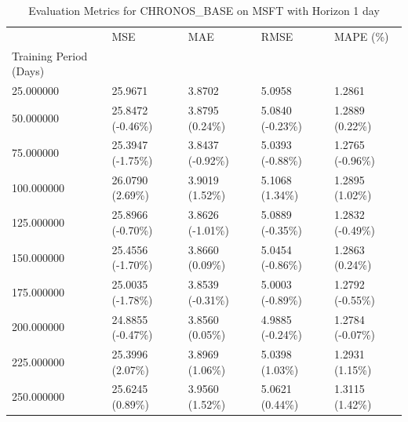 \begin{table}
\caption{Evaluation Metrics for CHRONOS_BASE on MSFT with Horizon 1 day}
\label{tab:chronos_base_MSFT_h1_metrics}
\begin{tabular}{lllll}
\toprule
 & MSE & MAE & RMSE & MAPE (\%) \\
Training Period (Days) &  &  &  &  \\
\midrule
25.000000 & 25.9671 & 3.8702 & 5.0958 & 1.2861 \\
50.000000 & 25.8472 (-0.46\%) & 3.8795 (0.24\%) & 5.0840 (-0.23\%) & 1.2889 (0.22\%) \\
75.000000 & 25.3947 (-1.75\%) & 3.8437 (-0.92\%) & 5.0393 (-0.88\%) & 1.2765 (-0.96\%) \\
100.000000 & 26.0790 (2.69\%) & 3.9019 (1.52\%) & 5.1068 (1.34\%) & 1.2895 (1.02\%) \\
125.000000 & 25.8966 (-0.70\%) & 3.8626 (-1.01\%) & 5.0889 (-0.35\%) & 1.2832 (-0.49\%) \\
150.000000 & 25.4556 (-1.70\%) & 3.8660 (0.09\%) & 5.0454 (-0.86\%) & 1.2863 (0.24\%) \\
175.000000 & 25.0035 (-1.78\%) & 3.8539 (-0.31\%) & 5.0003 (-0.89\%) & 1.2792 (-0.55\%) \\
200.000000 & 24.8855 (-0.47\%) & 3.8560 (0.05\%) & 4.9885 (-0.24\%) & 1.2784 (-0.07\%) \\
225.000000 & 25.3996 (2.07\%) & 3.8969 (1.06\%) & 5.0398 (1.03\%) & 1.2931 (1.15\%) \\
250.000000 & 25.6245 (0.89\%) & 3.9560 (1.52\%) & 5.0621 (0.44\%) & 1.3115 (1.42\%) \\
\bottomrule
\end{tabular}
\end{table}
